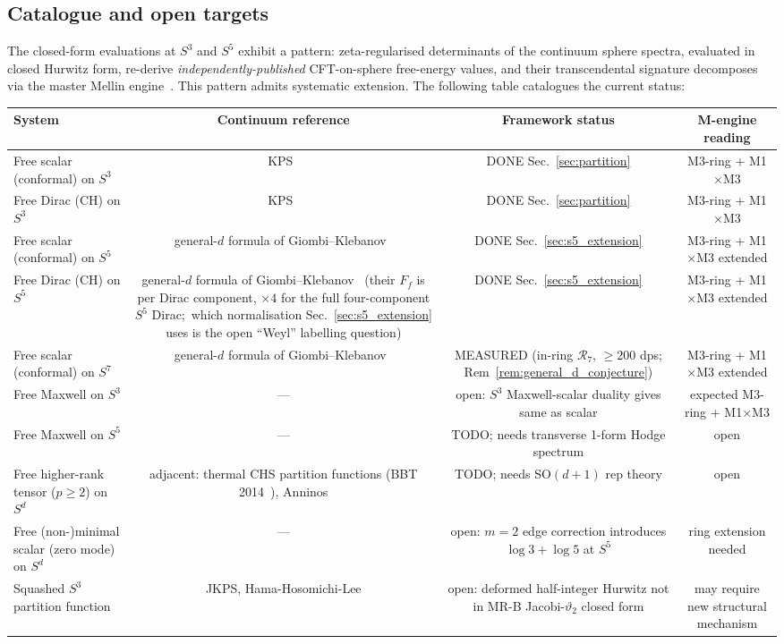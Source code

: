 \documentclass[11pt,a4paper]{article}
\theoremstyle{plain}
\theoremstyle{definition}
\newcommand{\sthree}{S^{3}}
\begin{document}
\subsection{Catalogue and open targets}
\label{sec:catalogue}

The closed-form evaluations at $S^{3}$ and $S^{5}$ exhibit a pattern:
zeta-regularised determinants of the continuum sphere spectra, evaluated
in closed Hurwitz form, re-derive \emph{independently-published}
CFT-on-sphere free-energy values, and their transcendental signature
decomposes via the master Mellin engine~\cite{paper18}. This pattern admits systematic
extension. The following table catalogues the current status:

\begin{center}
\begin{tabular}{lccc}
\toprule
System & Continuum reference & Framework status & M-engine reading \\
\midrule
Free scalar (conformal) on $\sthree$ & KPS~\cite{klebanov_pufu_safdi2011} & DONE Sec.~\ref{sec:partition} & M3-ring + M1$\times$M3 \\
Free Dirac (CH) on $\sthree$ & KPS~\cite{klebanov_pufu_safdi2011} & DONE Sec.~\ref{sec:partition} & M3-ring + M1$\times$M3 \\
Free scalar (conformal) on $S^{5}$ & general-$d$ formula of Giombi--Klebanov~\cite{giombi_klebanov2015} & DONE Sec.~\ref{sec:s5_extension} & M3-ring + M1$\times$M3 extended \\
Free Dirac (CH) on $S^{5}$ & general-$d$ formula of Giombi--Klebanov~\cite{giombi_klebanov2015} (their $F_f$ is per Dirac component, $\times 4$ for the full four-component $S^{5}$ Dirac;\ which normalisation Sec.~\ref{sec:s5_extension} uses is the open ``Weyl'' labelling question) & DONE Sec.~\ref{sec:s5_extension} & M3-ring + M1$\times$M3 extended \\
Free scalar (conformal) on $S^{7}$ & general-$d$ formula of Giombi--Klebanov~\cite{giombi_klebanov2015} & MEASURED (in-ring $\mathcal{R}_{7}$, $\geq 200$ dps; Rem~\ref{rem:general_d_conjecture}) & M3-ring + M1$\times$M3 extended \\
\midrule
Free Maxwell on $\sthree$ & --- & open: $\sthree$ Maxwell-scalar duality gives same as scalar & expected M3-ring + M1$\times$M3 \\
Free Maxwell on $S^{5}$ & --- & TODO; needs transverse 1-form Hodge spectrum & open \\
Free higher-rank tensor ($p \ge 2$) on $S^{d}$ & adjacent: thermal CHS partition functions (BBT 2014~\cite{beccaria_bekaert_tseytlin2014}), Anninos & TODO; needs $\mathrm{SO}(d+1)$ rep theory & open \\
Free (non-)minimal scalar (zero mode) on $S^{d}$ & --- & open: $m{=}2$ edge correction introduces $\log 3 + \log 5$ at $S^{5}$ & ring extension needed \\
Squashed $\sthree$ partition function & JKPS, Hama-Hosomichi-Lee & open: deformed half-integer Hurwitz not in MR-B Jacobi-$\vartheta_{2}$ closed form & may require new structural mechanism \\
\bottomrule
\end{tabular}
\end{center}
\end{document}
